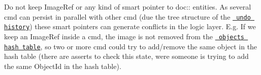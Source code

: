 Do not keep {\ttfamily Image\+Ref} or any kind of smart pointer to {\ttfamily doc\+:\+:} entities. As several {\ttfamily cmd} can persist in parallel with other {\ttfamily cmd} (due the tree structure of the \href{../../undo/undo_history.h}{\texttt{ undo history}}) these smart pointers can generate conflicts in the logic layer. E.\+g. If we keep an {\ttfamily Image\+Ref} inside a {\ttfamily cmd}, the image is not removed from the \href{../../doc/object.cpp}{\texttt{ objects hash table}}, so two or more {\ttfamily cmd} could try to add/remove the same object in the hash table (there are asserts to check this state, were someone is trying to add the same {\ttfamily Object\+Id} in the hash table). 